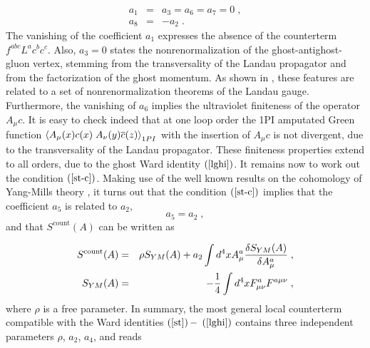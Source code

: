 \documentclass[a4paper,12pt]{article}
\begin{document}
\begin{eqnarray}
a_{1} &=&a_{3}=a_{6}=a_{7}=0\;,  \label{gh-r} \\
a_{8} &=&-a_{2}\;.  \nonumber
\end{eqnarray}
The vanishing of the coefficient $a_{1}$ expresses the absence of the
counterterm $f^{abc}L^{a}c^{b}c^{c}$. Also, $a_{3}=0$ states the
nonrenormalization of the ghost-antighost-gluon vertex, stemming from the
transversality of the Landau propagator and from the factorization of the
ghost momentum. As shown in \cite{bps}, these features are related to a set
of nonrenormalization theorems of the Landau gauge. Furthermore, the
vanishing of $a_{6}$ implies the ultraviolet finiteness of the operator $%
A_{\mu }c$. It is easy to check indeed that at one loop order the 1PI
amputated Green function $\left\langle A_{\mu }(x)c(x)\;A_{\nu }(y)\overline{%
c}(z)\right\rangle _{1PI}$ with the insertion of $A_{\mu }c$ is not
divergent, due to the transversality of the Landau propagator. These
finiteness properties extend to all orders, due to the ghost Ward identity $%
\left( \ref{lghi}\right) $. It remains now to work out the condition $\left( 
\ref{st-c}\right) $. Making use of the well known results on the cohomology
of Yang-Mills theory \cite{book,bbh}, it turns out that the condition $%
\left( \ref{st-c}\right) $ implies that the coefficient $a_{5}$ is related
to $a_{2},$%
\begin{equation}
a_{5}=a_{2}\;,  \label{a5}
\end{equation}
and that $S^{\mathrm{count}}(A)$ can be written as

\begin{eqnarray}
S^{\mathrm{count}}(A) &=&\rho S_{YM}(A)+a_{2}\int d^{4}xA_{\mu }^{a}\frac{%
\delta S_{YM}(A)}{\delta A_{\mu }^{a}}\;,  \nonumber \\
S_{YM}(A) &=&-\frac{1}{4}\int d^{4}xF_{\mu \nu }^{a}F^{a\mu \nu }\;,
\label{sca}
\end{eqnarray}
where $\rho $ is a free parameter. In summary, the most general local
counterterm compatible with the Ward identities $\left( \ref{st}\right) -$ $%
\left( \ref{lghi}\right) $ contains three independent parameters $\rho $, $%
a_{2}$, $a_{4}$, and reads
\end{document}
